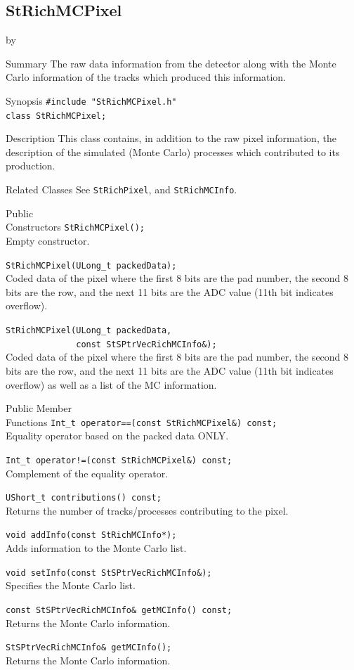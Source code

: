 \documentclass[twoside]{article}
\newcommand{\entrylabel}[1]{\mbox{\textbf{{#1}}}\hfil}%
\newenvironment{entry}
{\begin{list}{}%
    {\renewcommand{\makelabel}{\entrylabel}%
     \setlength{\labelwidth}{90pt}%
     \setlength{\leftmargin}{\labelwidth}
     \advance\leftmargin by \labelsep%
      }%
    }%
  {\end{list}}
\newcommand{\Entrylabel}[1]%
{\raisebox{0pt}[1ex][0pt]{\makebox[\labelwidth][l]%
    {\parbox[t]{\labelwidth}{\hspace{0pt}\textbf{{#1}}}}}}
\newenvironment{Entry}%
{\renewcommand{\entrylabel}{\Entrylabel}\begin{entry}}%
  {\end{entry}}
\begin{document}
\subsection{StRichMCPixel}
\label{sec:StRichMCPixel}
\begin{Entry}
\item[Summary] The raw data information from the detector
    along with the Monte Carlo information of the tracks which
    produced this information.
\item[Synopsis]
    \verb+#include "StRichMCPixel.h"+\\
    \verb+class StRichMCPixel;+\\
\item[Description] This class contains, in addition to the raw pixel
    information, the description of the simulated (Monte Carlo)
    processes which contributed to its production.
\item[Related Classes]
    See \texttt{StRichPixel}, and \texttt{StRichMCInfo}.
\item[Public\\ Constructors]
    \verb+StRichMCPixel();+\\
    Empty constructor.

    \verb+StRichMCPixel(ULong_t packedData);+\\
    Coded data of the pixel where the first 8 bits are the pad
    number, the second 8 bits are the row, and the next 11 bits
    are the ADC value (11th bit indicates overflow).

    \verb+StRichMCPixel(ULong_t packedData,+\\
    \verb+              const StSPtrVecRichMCInfo&);+\\
        Coded data of the pixel where the first 8 bits are the pad
    number, the second 8 bits are the row, and the next 11 bits
    are the ADC value (11th bit indicates overflow) as well as
    a list of the MC information.
\item[Public Member\\ Functions]
    \verb+Int_t operator==(const StRichMCPixel&) const;+\\
    Equality operator based on the packed data ONLY.

    \verb+Int_t operator!=(const StRichMCPixel&) const;+\\
    Complement of the equality operator.

    \verb+UShort_t contributions() const;+\\
    Returns the number of tracks/processes contributing
    to the pixel.

    \verb+void addInfo(const StRichMCInfo*);+\\
    Adds information to the Monte Carlo list.

    \verb+void setInfo(const StSPtrVecRichMCInfo&);+\\
    Specifies the Monte Carlo list.

    \verb+const StSPtrVecRichMCInfo& getMCInfo() const;+\\
    Returns the Monte Carlo information.

    \verb+StSPtrVecRichMCInfo& getMCInfo();+\\
    Returns the Monte Carlo information.
\end{Entry}
\end{document}
